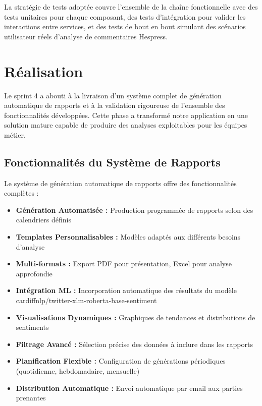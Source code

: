 La stratégie de tests adoptée couvre l'ensemble de la chaîne fonctionnelle avec des tests unitaires pour chaque composant, des tests d'intégration pour valider les interactions entre services, et des tests de bout en bout simulant des scénarios utilisateur réels d'analyse de commentaires Hespress.

\section{Réalisation}

Le sprint 4 a abouti à la livraison d'un système complet de génération automatique de rapports et à la validation rigoureuse de l'ensemble des fonctionnalités développées. Cette phase a transformé notre application en une solution mature capable de produire des analyses exploitables pour les équipes métier.

\subsection{Fonctionnalités du Système de Rapports}

Le système de génération automatique de rapports offre des fonctionnalités complètes :

\begin{itemize}
    \item \textbf{Génération Automatisée :} Production programmée de rapports selon des calendriers définis
    \item \textbf{Templates Personnalisables :} Modèles adaptés aux différents besoins d'analyse
    \item \textbf{Multi-formats :} Export PDF pour présentation, Excel pour analyse approfondie
    \item \textbf{Intégration ML :} Incorporation automatique des résultats du modèle cardiffnlp/twitter-xlm-roberta-base-sentiment
    \item \textbf{Visualisations Dynamiques :} Graphiques de tendances et distributions de sentiments
    \item \textbf{Filtrage Avancé :} Sélection précise des données à inclure dans les rapports
    \item \textbf{Planification Flexible :} Configuration de générations périodiques (quotidienne, hebdomadaire, mensuelle)
    \item \textbf{Distribution Automatique :} Envoi automatique par email aux parties prenantes
\end{itemize}

